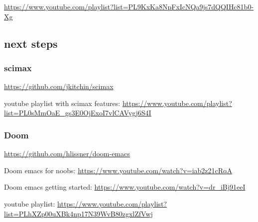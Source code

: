\documentclass[11pt]{article}
\begin{document}
\url{https://www.youtube.com/playlist?list=PL9KxKa8NpFxIcNQa9js7dQQIHc81b0-Xg}






\subsection{next steps}
\label{sec:org873adc7}

\subsubsection{scimax}
\label{sec:orgc1042b1}

\url{https://github.com/jkitchin/scimax}

youtube playlist with scimax features: \url{https://www.youtube.com/playlist?list=PL0sMmOaE\_gs3E0OjExoI7vlCAVygj6S4I}

\subsubsection{Doom}
\label{sec:org02ee11b}

\url{https://github.com/hlissner/doom-emacs}

Doom emacs for noobs: \url{https://www.youtube.com/watch?v=iab2z21cRqA}

Doom emacs getting started: \url{https://www.youtube.com/watch?v=dr\_iBj91eeI}


youtube playlist: \url{https://www.youtube.com/playlist?list=PLhXZp00uXBk4np17N39WvB80zgxlZfVwj}
\end{document}
